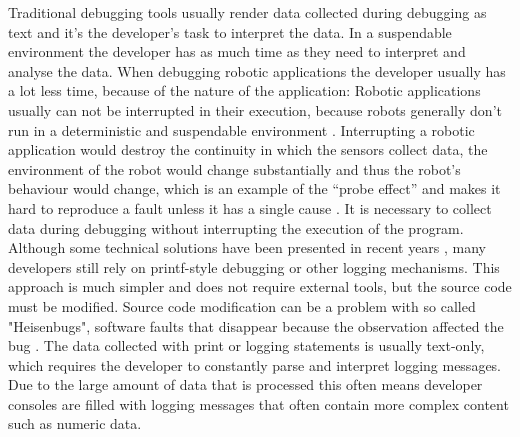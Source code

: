 Traditional debugging tools usually render data collected during debugging as text and it's the developer's task to interpret the data. In a suspendable environment the developer has as much time as they need to interpret and analyse the data. When debugging robotic applications the developer usually has a lot less time, because of the nature of the application: Robotic applications usually can not be interrupted in their execution, because robots generally don't run in a deterministic and suspendable environment \cite{Gumbley2009}. Interrupting a robotic application would destroy the continuity in which the sensors collect data, the environment of the robot would change substantially and thus the robot's behaviour would change, which is an example of the ``probe effect'' and makes it hard to reproduce a fault unless it has a single cause \cite{Gumbley2009}. It is necessary to collect data during debugging without interrupting the execution of the program. Although some technical solutions have been presented in recent years \cite{Gumbley2009}, many developers still rely on printf-style debugging or other logging mechanisms. This approach is much simpler and does not require external tools, but the source code must be modified. Source code modification can be a problem with so called "Heisenbugs", software faults that disappear because the observation affected the bug \cite{Grottke2005}. The data collected with print or logging statements is usually text-only, which requires the developer to constantly parse and interpret logging messages. Due to the large amount of data that is processed this often means developer consoles are filled with logging messages that often contain more complex content such as numeric data.



